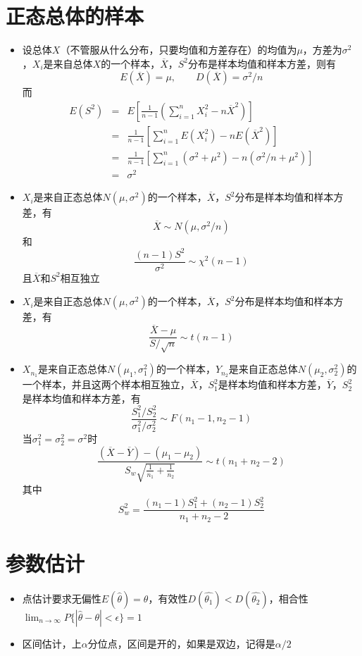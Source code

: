 \documentclass[UTF8]{ctexart}
\begin{document}
\section{正态总体的样本}
\begin{itemize}
	\item 设总体$X$（不管服从什么分布，只要均值和方差存在）的均值为$\mu$，方差为$\sigma^2$，$X_i$是来自总体$X$的一个样本，$\overline{X}$，$S^2$分布是样本均值和样本方差，则有
	\[
		E(\overline{X}) = \mu,\qquad D(\overline{X}) = \sigma^2 /n
	\]
	而
	\begin{eqnarray*}
		E(S^2) &=& E[\frac{1}{n-1}(\sum_{i=1}^n X_i^2-n\overline{X}^2)]\\
		       &=& \frac{1}{n-1}[\sum_{i=1}^n E(X_i^2) - nE(\overline{X}^2)]\\
		       &=& \frac{1}{n-1}[\sum_{i=1}^n (\sigma^2 + \mu^2) - n(\sigma^2/n + \mu^2)]\\
		       &=& \sigma^2
	\end{eqnarray*}

	\item $X_i$是来自正态总体$N(\mu,\sigma^2)$的一个样本，$\overline{X}$，$S^2$分布是样本均值和样本方差，有
	\[
		\overline{X} \sim N(\mu,\sigma^2/n)
	\]
	和
	\[
		\frac{(n-1)S^2}{\sigma^2} \sim \chi^2(n-1)
	\]
	且$\overline{X}$和$S^2$相互独立


	\item $X_i$是来自正态总体$N(\mu,\sigma^2)$的一个样本，$\overline{X}$，$S^2$分布是样本均值和样本方差，有
	\[
		\frac{\overline{X}-\mu}{S/\sqrt{n}} \sim t(n-1)
	\]

	\item $X_{n_1}$是来自正态总体$N(\mu_1,\sigma_1^2)$的一个样本，$Y_{n_2}$是来自正态总体$N(\mu_2,\sigma_2^2)$的一个样本，并且这两个样本相互独立，$\overline{X}$，$S_1^2$是样本均值和样本方差，$\overline{Y}$，$S_2^2$是样本均值和样本方差，有
	\[
		\frac{S_1^2/S_2^2}{\sigma_1^2/\sigma_2^2} \sim F(n_1-1,n_2-1)
	\]
	当$\sigma_1^2 = \sigma_2^2 = \sigma^2$时
	\[
		\frac{(\overline{X} - \overline{Y})-(\mu_1 - \mu_2)}{S_w\sqrt{\frac{1}{n_1}+\frac{1}{n_2}}}\sim t(n_1+n_2 -2)
	\]
	其中
	\[
		S_w^2 = \frac{(n_1-1)S_1^2+(n_2-1)S_2^2}{n_1+n_2 -2}
	\]
\end{itemize}


\section{参数估计}
\begin{itemize}

	\item 点估计要求无偏性$E(\hat{\theta})=\theta$，有效性$D(\hat{\theta_1})<D(\hat{\theta_2})$，相合性$\lim_{n\to \infty}P\{ |\hat{\theta}-\theta | < \epsilon\} = 1$

	\item 区间估计，上$\alpha$分位点，区间是开的，如果是双边，记得是$\alpha/2$
\end{itemize}
\end{document}
